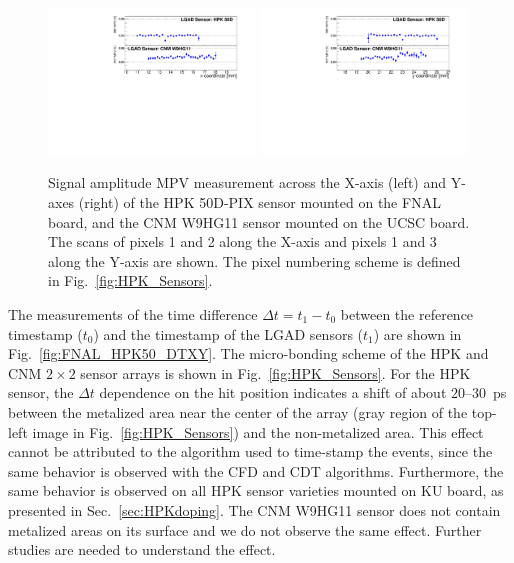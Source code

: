 \documentclass[preprint,1p]{elsarticle}
\begin{document}
\begin{figure}[htbp] 
\centering
\includegraphics[width=0.49\textwidth]{figs/HPK50DVsCNM_MPV_vs_X.pdf} 
\includegraphics[width=0.49\textwidth]{figs/HPK50DVsCNM_MPV_vs_Y.pdf} 
\caption{Signal amplitude MPV measurement across the X-axis (left) and Y-axes (right) of 
the HPK 50D-PIX sensor mounted on the FNAL board, and the CNM W9HG11 sensor mounted on 
the UCSC board. The scans of pixels 1 and 2 along the X-axis and pixels 1 and 3 
along the Y-axis are shown. The pixel numbering scheme is defined in Fig.~\ref{fig:HPK_Sensors}.} 
\label{fig:FNAL_HPK50_MPVXY} 
\end{figure} 


The measurements of the time difference $\Delta t = t_{1}-t_{0}$ between the
reference timestamp ($t_0$) and the timestamp of the LGAD sensors ($t_1$) are
shown in Fig.~\ref{fig:FNAL_HPK50_DTXY}. The micro-bonding scheme of the HPK and
CNM $2\times 2$ sensor arrays is shown in Fig.~\ref{fig:HPK_Sensors}. For the
HPK sensor, the $\Delta t$ dependence on the hit position indicates a shift of
about $20$--$30$~ps between the metalized area near the center of the array
(gray region of the top-left image in Fig.~\ref{fig:HPK_Sensors}) and the
non-metalized area. 
This effect cannot be attributed to the algorithm used to time-stamp the events,
since the same behavior is observed with the CFD and CDT algorithms.
Furthermore, the same behavior is observed on all HPK sensor varieties mounted
on KU board, as presented in Sec.~\ref{sec:HPKdoping}.  The CNM W9HG11 sensor
does not contain metalized areas on its surface and we do not observe the same effect. Further
studies are needed to understand the effect.
\end{document}
